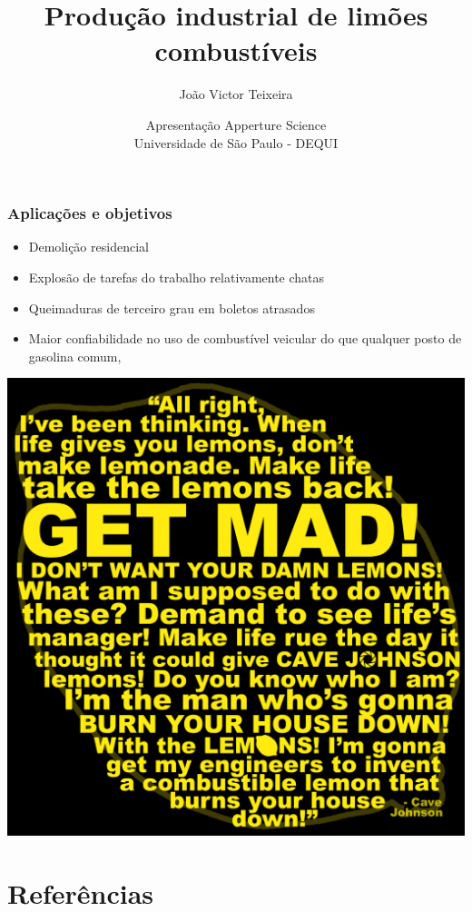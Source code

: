 \documentclass{beamer}
\title{\textbf{Produção industrial de limões combustíveis}}
\author{João Victor Teixeira \\
  \text{\scriptsize{jvteixeira@usp.br}}}
\date[EEL-USP]{\scriptsize{Apresentação Apperture Science} \\ Universidade de São Paulo - DEQUI}
\begin{document}

\begin{frame}
	\titlepage
\end{frame}

\begin{frame}
\frametitle{Aplicações e objetivos}

\begin{tcolorbox}[colback=blue!7!white,colframe=blue!80!white,title=Possíveis utilidades]
\begin{itemize}
\item<3->[\ding{115}]{Demolição residencial}
\item<1->[\ding{115}]{Explosão de tarefas do trabalho relativamente chatas}
\item<2->[\ding{115}]{Queimaduras de terceiro grau em boletos atrasados}
\item<4->[\ding{115}]{Maior confiabilidade no uso de combustível veicular do que qualquer posto de gasolina comum, \cite{combustible}}
\end{itemize}
\centering
\includegraphics[scale=0.25]{lemons.png}

\end{tcolorbox}

\end{frame}
\section{Referências}

\end{document}
